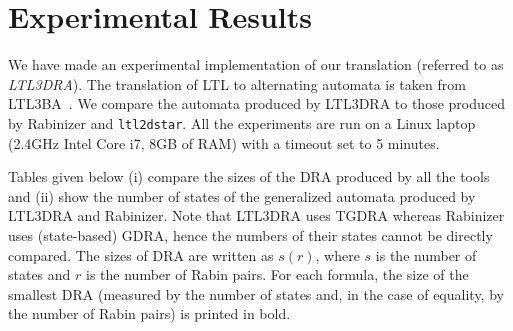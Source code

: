 \documentclass{llncs}
\begin{document}
\section{Experimental Results}
\label{sec:experiments}
We have made an experimental implementation of our translation (referred to
as \emph{LTL3DRA}). The translation of LTL to alternating automata is taken
from LTL3BA~\cite{BKRS12}.  We compare the automata produced
by LTL3DRA to those produced by Rabinizer and \texttt{ltl2dstar}. All the
experiments are run on a Linux laptop (2.4GHz Intel Core i7, 8GB of RAM)
with a timeout set to 5 minutes.

Tables given below (i) compare the sizes of the DRA produced by all the
tools and (ii) show the number of states of the generalized automata
produced by LTL3DRA and Rabinizer. Note that LTL3DRA uses TGDRA
whereas Rabinizer uses (state-based) GDRA,
hence the numbers of their states cannot be
directly compared. The sizes of DRA are written as $s(r)$, where $s$ is the
number of states and $r$ is the number of Rabin pairs.  For each formula,
the size of the smallest DRA (measured by the number of states and, in the
case of equality, by the number of Rabin pairs) is printed in bold.
\end{document}
